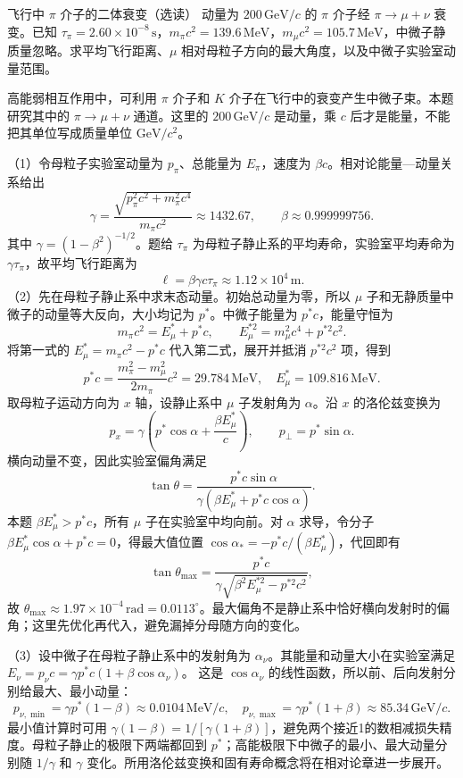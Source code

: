\begin{practicebox}{飞行中 $\pi$ 介子的二体衰变（选读）}
动量为 $200\,\mathrm{GeV}/c$ 的 $\pi$ 介子经 $\pi\to\mu+\nu$ 衰变。已知 $\tau_\pi=2.60\times10^{-8}\,\mathrm s$，$m_\pi c^2=139.6\,\mathrm{MeV}$，$m_\mu c^2=105.7\,\mathrm{MeV}$，中微子静质量忽略。求平均飞行距离、$\mu$ 相对母粒子方向的最大角度，以及中微子实验室动量范围。
\label{r2ch02:pr:019}
\begin{solution}
高能弱相互作用中，可利用 $\pi$ 介子和 $K$ 介子在飞行中的衰变产生中微子束。本题研究其中的 $\pi\to\mu+\nu$ 通道。这里的 $200\,\mathrm{GeV}/c$ 是动量，乘 $c$ 后才是能量，不能把其单位写成质量单位 $\mathrm{GeV}/c^2$。

（1）令母粒子实验室动量为 $p_\pi$、总能量为 $E_\pi$，速度为 $\beta c$。相对论能量—动量关系给出
\[
 \gamma=\frac{\sqrt{p_\pi^2c^2+m_\pi^2c^4}}{m_\pi c^2}\approx1432.67,\qquad
 \beta\approx0.999999756.
\]
其中 $\gamma=(1-\beta^2)^{-1/2}$。题给 $\tau_\pi$ 为母粒子静止系的平均寿命，实验室平均寿命为 $\gamma\tau_\pi$，故平均飞行距离为
\[
 \boxed{\ell=\beta\gamma c\tau_\pi\approx1.12\times10^4\,\mathrm m}.
\]
（2）先在母粒子静止系中求末态动量。初始总动量为零，所以 $\mu$ 子和无静质量中微子的动量等大反向，大小均记为 $p^*$。中微子能量为 $p^*c$，能量守恒为
\[
 m_\pi c^2=E_\mu^*+p^*c,\qquad
 E_\mu^{*2}=m_\mu^2c^4+p^{*2}c^2.
\]
将第一式的 $E_\mu^*=m_\pi c^2-p^*c$ 代入第二式，展开并抵消 $p^{*2}c^2$ 项，得到
\[
 p^*c=\frac{m_\pi^2-m_\mu^2}{2m_\pi}c^2=29.784\,\mathrm{MeV},\quad
 E_\mu^*=109.816\,\mathrm{MeV}.
\]
取母粒子运动方向为 $x$ 轴，设静止系中 $\mu$ 子发射角为 $\alpha$。沿 $x$ 的洛伦兹变换为
\[
 p_x=\gamma\left(p^*\cos\alpha+\frac{\beta E_\mu^*}{c}\right),
 \qquad p_\perp=p^*\sin\alpha.
\]
横向动量不变，因此实验室偏角满足
\[
 \tan\theta=\frac{p^*c\sin\alpha}
 {\gamma(\beta E_\mu^*+p^*c\cos\alpha)}.
\]
本题 $\beta E_\mu^*>p^*c$，所有 $\mu$ 子在实验室中均向前。对 $\alpha$ 求导，令分子
$\beta E_\mu^*\cos\alpha+p^*c=0$，得最大值位置
$\cos\alpha_*=-p^*c/(\beta E_\mu^*)$，代回即有
\[
 \tan\theta_{\max}=\frac{p^*c}{\gamma\sqrt{\beta^2E_\mu^{*2}-p^{*2}c^2}},
\]
故 $\boxed{\theta_{\max}\approx1.97\times10^{-4}\,\mathrm{rad}=0.0113^\circ}$。最大偏角不是静止系中恰好横向发射时的偏角；这里先优化再代入，避免漏掉分母随方向的变化。

（3）设中微子在母粒子静止系中的发射角为 $\alpha_\nu$。其能量和动量大小在实验室满足
$E_\nu=p_\nu c=\gamma p^*c(1+\beta\cos\alpha_\nu)$。
这是 $\cos\alpha_\nu$ 的线性函数，所以前、后向发射分别给最大、最小动量：
\[
 \boxed{p_{\nu,\min}=\gamma p^*(1-\beta)\approx0.0104\,\mathrm{MeV}/c},
\quad
 \boxed{p_{\nu,\max}=\gamma p^*(1+\beta)\approx85.34\,\mathrm{GeV}/c}.
\]
最小值计算时可用 $\gamma(1-\beta)=1/[\gamma(1+\beta)]$，避免两个接近1的数相减损失精度。母粒子静止的极限下两端都回到 $p^*$；高能极限下中微子的最小、最大动量分别随 $1/\gamma$ 和 $\gamma$ 变化。所用洛伦兹变换和固有寿命概念将在相对论章进一步展开。
\end{solution}
\end{practicebox}

